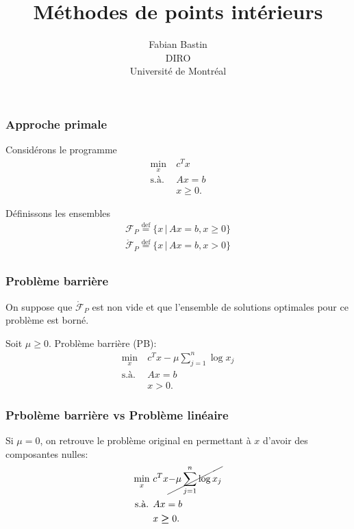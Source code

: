 \documentclass[usepdftitle=false, aspectratio=169]{beamer}
\title[Points intérieurs]{Méthodes de points intérieurs}
\author[Fabian Bastin]{Fabian Bastin\\DIRO\\Université de Montréal}
\date{}
\begin{document}
\frame{\titlepage}

\begin{frame}
\frametitle{Approche primale}



Considérons le programme
\begin{align*}
\min_x \ & c^Tx \\
\mbox{s.à. } & Ax = b\\
& x \geq 0.
\end{align*}

\mbox{}

Définissons les ensembles
\begin{align*}
\mathcal{F}_P \overset{\mbox{def}}{=} \lbrace x \,|\, Ax = b, x \geq 0 \rbrace\\
\mathring{\mathcal{F}}_P \overset{\mbox{def}}{=} \lbrace x \,|\, Ax = b, x > 0 \rbrace\\
\end{align*}

\end{frame}

\begin{frame}
\frametitle{Problème barrière}

On suppose que $\mathring{\mathcal{F}}_P$ est non vide et que l'ensemble de solutions optimales pour ce problème est borné.

\mbox{}

Soit $\mu \geq 0$. Problème barrière (PB):
\begin{align*}
\min_x \ & c^Tx - \mu \sum_{j = 1}^n \log x_j \\
\mbox{s.à. } & Ax = b \\
& x > 0.
\end{align*}

\end{frame}

\begin{frame}
\frametitle{Prbolème barrière vs Problème linéaire}

Si $\mu = 0$, on retrouve le problème original en permettant à $x$ d'avoir des composantes nulles:
\begin{align*}
\min_x \ & c^Tx \cancel{- \mu \sum_{j = 1}^n \log x_j} \\
\mbox{s.à. } & Ax = b \\
& x \boldsymbol{\geq} 0.
\end{align*}

\end{frame}
\end{document}
